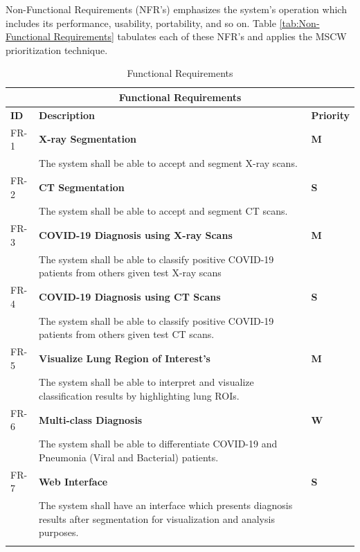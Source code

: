 Non-Functional Requirements (NFR's) emphasizes the system's operation which includes its performance, usability, portability, and so on. Table \ref{tab:Non-Functional Requirements} tabulates each of these NFR's and applies the MSCW prioritization technique.

\begin{longtable}{| p{} | p{} | p{} |} 
\hline
\multicolumn{3}{|c|}{\textbf{Functional Requirements}}\\
\hline
\textbf{ID} & \textbf{Description} & \textbf{Priority}  \\
\hline
FR-1 & \textbf{X-ray Segmentation}  & \cellcolor{green}\textbf{M} \\ &  The system shall be able to accept and segment X-ray scans. & \cellcolor{green} \\ \hline 
FR-2 & \textbf{CT Segmentation}  & \cellcolor{cyan}\textbf{S} \\ &  The system shall be able to accept and segment CT scans. & \cellcolor{cyan} \\ \hline 
FR-3 & \textbf{COVID-19 Diagnosis using X-ray Scans}  & \cellcolor{green}\textbf{M} \\ & The system shall be able to classify positive COVID-19 patients from others given test X-ray scans & \cellcolor{green} \\ \hline 
FR-4 & \textbf{COVID-19 Diagnosis using CT Scans}  & \cellcolor{cyan}\textbf{S} \\ &  The system shall be able to classify positive COVID-19 patients from others given test CT scans. & \cellcolor{cyan} \\ \hline
FR-5 & \textbf{Visualize Lung Region of Interest's}  & \cellcolor{green}\textbf{M} \\ &  The system shall be able to interpret and visualize classification results by highlighting lung ROIs. & \cellcolor{green} \\ \hline 
FR-6 & \textbf{Multi-class Diagnosis}  & \cellcolor{pink}\textbf{W} \\ &  The system shall be able to differentiate COVID-19 and Pneumonia (Viral and Bacterial) patients. & \cellcolor{pink} \\ \hline 
FR-7 & \textbf{Web Interface}  & \cellcolor{cyan}\textbf{S} \\ &  The system shall have an interface which presents diagnosis results after segmentation for visualization and analysis purposes. & \cellcolor{cyan} \\ \hline

\caption{Functional Requirements}

  \label{tab:Functional Requirements}
  \end{longtable}

